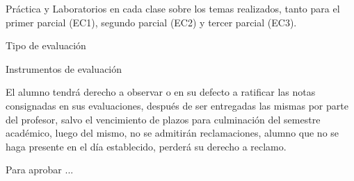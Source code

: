 \documentclass[a4paper,8pt]{article}
\begin{document}
\begin{cronogramaAcademico}
\end{cronogramaAcademico}

\begin{estrategiasEvaluacion}
    \begin{evaluacionContinua}
        Práctica y Laboratorios en cada clase sobre los temas realizados, tanto para el primer parcial (EC1), segundo parcial (EC2) y tercer parcial (EC3).
    \end{evaluacionContinua}
    \begin{evaluacionPeriodica}
    \end{evaluacionPeriodica}
    \begin{cronogramaEvaluacion}
    \end{cronogramaEvaluacion}
    \begin{tipoEvaluacion}
        Tipo de evaluación
    \end{tipoEvaluacion}
    \begin{instrumentosEvaluacion}
        Instrumentos de evaluación
    \end{instrumentosEvaluacion}
\end{estrategiasEvaluacion}

\begin{requisitosAprobacion}
\item El alumno tendrá derecho a observar o en su defecto a ratificar las notas consignadas en sus evaluaciones, después de ser entregadas las mismas por parte del profesor, salvo el vencimiento de plazos para culminación del semestre académico, luego del mismo, no se admitirán reclamaciones,
alumno que no se haga presente en el día establecido, perderá su derecho a reclamo.
\item Para aprobar ...
\end{requisitosAprobacion}




\fecha
\firma
\end{document}
